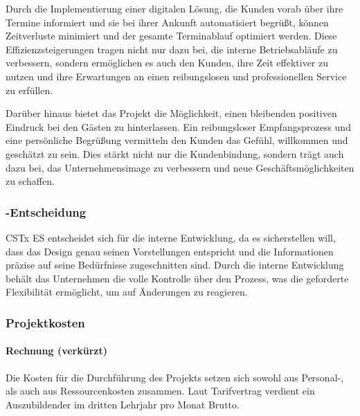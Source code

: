 Durch die Implementierung einer digitalen Lösung, die Kunden vorab über ihre Termine informiert und sie bei ihrer Ankunft automatisiert begrüßt, können Zeitverluste minimiert und der gesamte Terminablauf optimiert werden.
Diese Effizienzsteigerungen tragen nicht nur dazu bei, die interne Betriebsabläufe zu verbessern, sondern ermöglichen es auch den Kunden, ihre Zeit effektiver zu nutzen und ihre Erwartungen an einen reibungslosen und professionellen Service zu erfüllen.

Darüber hinaus bietet das Projekt die Möglichkeit, einen bleibenden positiven Eindruck bei den Gästen zu hinterlassen.
Ein reibungsloser Empfangsprozess und eine persönliche Begrüßung vermitteln den Kunden das Gefühl, willkommen und geschätzt zu sein.
Dies stärkt nicht nur die Kundenbindung, sondern trägt auch dazu bei, das Unternehmensimage zu verbessern und neue Geschäftsmöglichkeiten zu schaffen.


\subsubsection{-Entscheidung}
\label{sec:MakeOrBuyEntscheidung}
\ac{CSTx ES} entscheidet sich für die interne Entwicklung, da es sicherstellen will, dass das Design genau seinen Vorstellungen entspricht und die Informationen präzise auf seine Bedürfnisse zugeschnitten sind.
Durch die interne Entwicklung behält das Unternehmen die volle Kontrolle über den Prozess, was die geforderte Flexibilität ermöglicht, um auf Änderungen zu reagieren.


\subsubsection{Projektkosten}
\label{sec:Projektkosten}

\paragraph{Rechnung (verkürzt)}
Die Kosten für die Durchführung des Projekts setzen sich sowohl aus Personal-, als auch aus Ressourcenkosten zusammen.
Laut Tarifvertrag verdient ein Auszubildender im dritten Lehrjahr pro Monat  Brutto.

